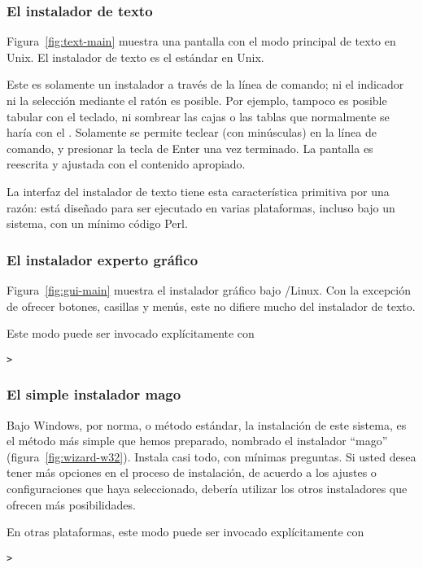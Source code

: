 \documentclass{article}
\begin{document}
\subsubsection{El instalador de texto}

Figura~\ref{fig:text-main} muestra una pantalla con el modo principal
de texto en Unix. El instalador de texto es el estándar en Unix. 

Este es solamente un instalador a través de la línea de comando; ni el
indicador ni la selección mediante el ratón es posible. Por ejemplo,
tampoco es posible tabular con el teclado, ni sombrear las cajas o las
tablas que normalmente se haría con el \GUI. Solamente se permite
teclear (con minúsculas) en la línea de comando, y presionar la tecla
de Enter una vez terminado. La pantalla es reescrita y ajustada con el
contenido apropiado. 

La interfaz del instalador de texto tiene esta
característica primitiva por una razón: está diseñado para
ser ejecutado en varias plataformas, incluso bajo un
sistema, con un mínimo código Perl. 

\subsubsection{El instalador experto gráfico}

Figura~\ref{fig:gui-main} muestra el instalador gráfico bajo
\GNU/Linux. Con la excepción de ofrecer botones, casillas y
menús, este no difiere mucho del instalador de texto.

Este modo puede ser invocado explícitamente con
\begin{alltt}
	> 
\end{alltt}

\subsubsection{El simple instalador mago}

Bajo Windows, por norma, o método estándar, la instalación
de este sistema, es el método más simple que hemos preparado,
nombrado el instalador ``mago''
(figura~\ref{fig:wizard-w32}). Instala casi todo, con
mínimas preguntas. Si usted desea tener más opciones en el
proceso de instalación, de acuerdo a los ajustes o
configuraciones que haya seleccionado, debería utilizar los
otros instaladores que ofrecen más posibilidades. 

En otras plataformas, este modo puede ser invocado explícitamente con
\begin{alltt}
	> 
\end{alltt}
\end{document}
